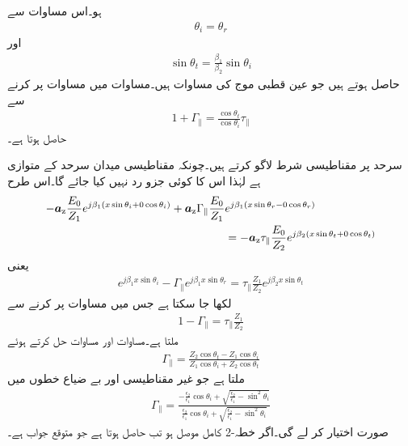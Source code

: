 ہو۔اس مساوات سے
\begin{align}
\theta_i=\theta_r
\end{align}
اور
\begin{align}
\sin \theta_t =\frac{\beta_1}{\beta_2} \sin \theta_i
\end{align}
حاصل ہوتے ہیں جو عین  قطبی موج کی مساوات ہیں۔مساوات  میں مساوات  پر کرنے سے
\begin{align}\label{مساوات_ترچھی_متوازی_انعکاسی_انحرافی_تعلق_الف}
1   +  \Gamma_{\parallel} =\frac{\cos \theta_t}{\cos \theta_i} \tau_{\parallel} 
\end{align}
حاصل ہوتا ہے۔

سرحد پر مقناطیسی شرط لاگو کرتے ہیں۔چونکہ مقناطیسی میدان سرحد کے متوازی ہے لہٰذا اس کا کوئی جزو رد نہیں کیا جائے گا۔اس طرح
\begin{align*}
-{\boldsymbol{a}}_{\textup{z}} \frac{E_0}{Z_1} e^{j\beta_1 (x\sin \theta_i +0 \cos \theta_i)}+{\boldsymbol{a}}_{\textup{z}} \Gamma_{\parallel} \frac{ E_0}{Z_1} &e^{j \beta_1 (x \sin \theta_r-0\cos \theta_r)}\\
&=-{\boldsymbol{a}}_{\textup{z}} \tau_{\parallel} \frac{E_0}{Z_2} e^{j \beta_2 (x \sin \theta_t+0\cos \theta_t)} 
\end{align*}
یعنی
\begin{align*}
 e^{j\beta_1 x\sin \theta_i}-\Gamma_{\parallel}  e^{j \beta_1 x \sin \theta_r}= \tau_{\parallel} \frac{Z_1}{Z_2} e^{j \beta_2 x \sin \theta_t} 
\end{align*}
لکھا جا سکتا ہے جس میں مساوات  پر کرنے سے
\begin{align}\label{مساوات_ترچھی_متوازی_انعکاسی_انحرافی_تعلق_ب}
1-\Gamma_{\parallel} = \tau_{\parallel} \frac{Z_1}{Z_2} 
\end{align}
ملتا ہے۔مساوات  اور مساوات  حل کرتے ہوئے
\begin{align}\label{مساوات_ترچھی_شرح_انعکاس_متوازی_موج_الف}
\Gamma_{\parallel} =\frac{Z_2 \cos \theta_t -Z_1 \cos \theta_i}{Z_1 \cos \theta_i+Z_2 \cos \theta_t}
\end{align}
ملتا ہے جو غیر مقناطیسی اور بے ضیاع خطوں میں
\begin{align}\label{مساوات_ترچھی_شرح_انعکاس_بلمقابل_زاویہ_آمد}
\Gamma_{\parallel} =\frac{-\frac{\epsilon_2}{\epsilon_1}\cos \theta_i+\sqrt{\frac{\epsilon_2}{\epsilon_1}-\sin^2 \theta_i}}{\frac{\epsilon_2}{\epsilon_1}\cos \theta_i+\sqrt{\frac{\epsilon_2}{\epsilon_1}-\sin^2 \theta_i}}
\end{align}
صورت اختیار کر لے گی۔اگر خطہ-2 کامل موصل ہو تب  حاصل ہوتا ہے جو متوقع جواب ہے۔ 

